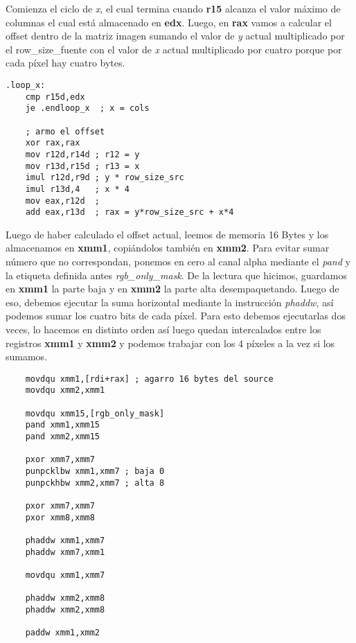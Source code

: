 \documentclass[a4paper]{article}
\begin{document}
\indent Comienza el ciclo de \emph{x}, el cual termina cuando \textbf{r15} alcanza el valor m\'aximo de columnas el cual est\'a almacenado en \textbf{edx}. Luego, en \textbf{rax} vamos a calcular el offset dentro de la matriz imagen sumando el valor de \emph{y} actual multiplicado por el row_size_fuente con el valor de \emph{x} actual multiplicado por cuatro porque por cada p\'ixel hay cuatro bytes.
\begin{codesnippet}
\begin{verbatim}
.loop_x:
    cmp r15d,edx
    je .endloop_x  ; x = cols

    ; armo el offset
    xor rax,rax
    mov r12d,r14d ; r12 = y
    mov r13d,r15d ; r13 = x
    imul r12d,r9d ; y * row_size_src
    imul r13d,4   ; x * 4 
    mov eax,r12d  ; 
    add eax,r13d  ; rax = y*row_size_src + x*4 
\end{verbatim}
\end{codesnippet}

\indent Luego de haber calculado el offset actual, leemos de memoria 16 Bytes y los almacenamos en \textbf{xmm1}, copi\'andolos tambi\'en en \textbf{xmm2}. Para evitar sumar n\'umero que no correspondan, ponemos en cero al canal alpha mediante el \textit{pand} y la etiqueta definida antes \textit{rgb_only_mask}. De la lectura que hicimos, guardamos en \textbf{xmm1} la parte baja y en \textbf{xmm2} la parte alta desempaquetando. Luego de eso, debemos ejecutar la suma horizontal mediante la instrucci\'on \textit{phaddw}, as\'i podemos sumar los cuatro bits de cada p\'ixel. Para esto debemos ejecutarlas dos veces, lo hacemos en distinto orden as\'i luego quedan intercalados entre los registros \textbf{xmm1} y \textbf{xmm2} y podemos trabajar con los 4 p\'ixeles a la vez si los sumamos.
\begin{codesnippet}
\begin{verbatim}
    movdqu xmm1,[rdi+rax] ; agarro 16 bytes del source
    movdqu xmm2,xmm1

    movdqu xmm15,[rgb_only_mask]
    pand xmm1,xmm15
    pand xmm2,xmm15

    pxor xmm7,xmm7
    punpcklbw xmm1,xmm7 ; baja 0
    punpckhbw xmm2,xmm7 ; alta 8

    pxor xmm7,xmm7
    pxor xmm8,xmm8

    phaddw xmm1,xmm7
    phaddw xmm7,xmm1 
    
    movdqu xmm1,xmm7

    phaddw xmm2,xmm8
    phaddw xmm2,xmm8

    paddw xmm1,xmm2
\end{verbatim}
\end{codesnippet}
\end{document}
